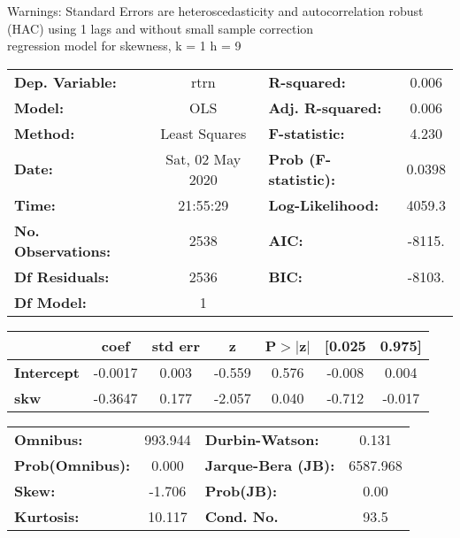 Warnings: \newline
 [1] Standard Errors are heteroscedasticity and autocorrelation robust (HAC) using 1 lags and without small sample correction\\ 

regression model for skewness, k = 1 h = 9\begin{center}
\begin{tabular}{lclc}
\toprule
\textbf{Dep. Variable:}    &       rtrn       & \textbf{  R-squared:         } &     0.006   \\
\textbf{Model:}            &       OLS        & \textbf{  Adj. R-squared:    } &     0.006   \\
\textbf{Method:}           &  Least Squares   & \textbf{  F-statistic:       } &     4.230   \\
\textbf{Date:}             & Sat, 02 May 2020 & \textbf{  Prob (F-statistic):} &   0.0398    \\
\textbf{Time:}             &     21:55:29     & \textbf{  Log-Likelihood:    } &    4059.3   \\
\textbf{No. Observations:} &        2538      & \textbf{  AIC:               } &    -8115.   \\
\textbf{Df Residuals:}     &        2536      & \textbf{  BIC:               } &    -8103.   \\
\textbf{Df Model:}         &           1      & \textbf{                     } &             \\
\bottomrule
\end{tabular}
\begin{tabular}{lcccccc}
                   & \textbf{coef} & \textbf{std err} & \textbf{z} & \textbf{P$> |$z$|$} & \textbf{[0.025} & \textbf{0.975]}  \\
\midrule
\textbf{Intercept} &      -0.0017  &        0.003     &    -0.559  &         0.576        &       -0.008    &        0.004     \\
\textbf{skw}       &      -0.3647  &        0.177     &    -2.057  &         0.040        &       -0.712    &       -0.017     \\
\bottomrule
\end{tabular}
\begin{tabular}{lclc}
\textbf{Omnibus:}       & 993.944 & \textbf{  Durbin-Watson:     } &    0.131  \\
\textbf{Prob(Omnibus):} &   0.000 & \textbf{  Jarque-Bera (JB):  } & 6587.968  \\
\textbf{Skew:}          &  -1.706 & \textbf{  Prob(JB):          } &     0.00  \\
\textbf{Kurtosis:}      &  10.117 & \textbf{  Cond. No.          } &     93.5  \\
\bottomrule
\end{tabular}
\end{center}

